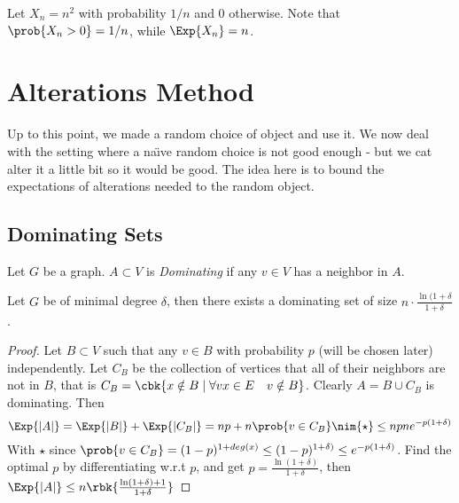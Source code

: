 \documentclass[a4paper, 11pt, oneside]{book}
\begin{document}
\begin{remark}
	Let $X_n = n^2$ with probability $1/n$ and $0$ otherwise. Note that $\prob{X_n > 0} = 1/n$, while $\Exp{X_n} = n$.
\end{remark}


\chapter{Alterations Method}
Up to this point, we made a random choice of object and use it. We now deal with the setting where a na\"{\i}ve random choice is not good enough - but we cat alter it a little bit so it would be good. The idea here is to bound the expectations of alterations needed to the random object.
\section{Dominating Sets}
\begin{yellowBox}
\begin{defn}
	Let $G$ be a graph. $A\subset V$ is \emph{Dominating} if any $v\in V$ has a neighbor in $A$.
\end{defn}	
\end{yellowBox}
\begin{thm}
	Let $G$ be of minimal degree $\delta$, then there exists a dominating set of size $n\cdot \frac{\ln(1+\delta}{1+\delta}$.
\end{thm}
\begin{proof}
	Let $B\subset V$ such that any $v\in B$ with probability $p$ (will be chosen later) independently. Let $C_B$ be the collection of vertices that all of their neighbors are not in $B$, that is $C_B = \cbk{x\notin B\mid \forall vx\in E\quad v\notin B}$. Clearly $A = B\cup C_B$ is dominating. Then
	\[
	\Exp{|A|} = \Exp{|B|} + \Exp{|C_B|} = np + n\prob{v\in C_B}\nim{\star}\le np ne^{-p(1+\delta)}
	\]
	With $\star$ since $\prob{v\in C_B} = (1-p)^{1+deg(x)}\le (1-p)^{1+\delta)} \le e^{-p(1+\delta)}$.
	 Find the optimal $p$ by differentiating w.r.t $p$,  and get $p = \frac{\ln(1+\delta)}{1+\delta}$, then $\Exp{|A|} \le n\rbk{\frac{\ln(1+\delta)+1}{1+\delta}}$
\end{proof}
\end{document}
